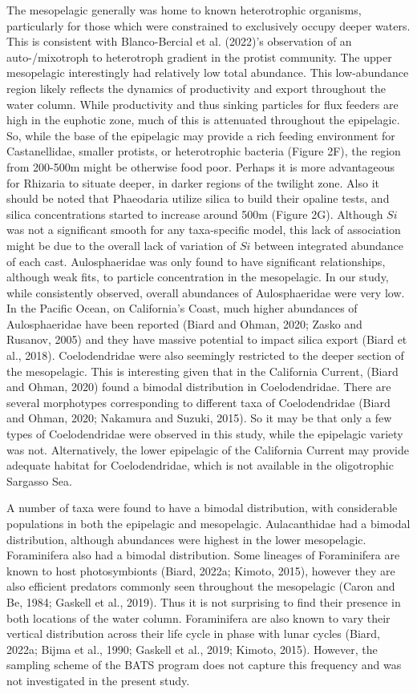 \documentclass[
]{article}
\begin{document}
The mesopelagic generally was home to known heterotrophic organisms,
particularly for those which were constrained to exclusively occupy
deeper waters. This is consistent with Blanco-Bercial et al. (2022)'s
observation of an auto-/mixotroph to heterotroph gradient in the protist
community. The upper mesopelagic interestingly had relatively low total
abundance. This low-abundance region likely reflects the dynamics of
productivity and export throughout the water column. While productivity
and thus sinking particles for flux feeders are high in the euphotic
zone, much of this is attenuated throughout the epipelagic. So, while
the base of the epipelagic may provide a rich feeding environment for
Castanellidae, smaller protists, or heterotrophic bacteria (Figure 2F),
the region from 200-500m might be otherwise food poor. Perhaps it is
more advantageous for Rhizaria to situate deeper, in darker regions of
the twilight zone. Also it should be noted that Phaeodaria utilize
silica to build their opaline tests, and silica concentrations started
to increase around 500m (Figure 2G). Although \(Si\) was not a
significant smooth for any taxa-specific model, this lack of association
might be due to the overall lack of variation of \(Si\) between
integrated abundance of each cast. Aulosphaeridae was only found to have
significant relationships, although weak fits, to particle concentration
in the mesopelagic. In our study, while consistently observed, overall
abundances of Aulosphaeridae were very low. In the Pacific Ocean, on
California's Coast, much higher abundances of Aulosphaeridae have been
reported (Biard and Ohman, 2020; Zasko and Rusanov, 2005) and they have
massive potential to impact silica export (Biard et al., 2018).
Coelodendridae were also seemingly restricted to the deeper section of
the mesopelagic. This is interesting given that in the California
Current, (Biard and Ohman, 2020) found a bimodal distribution in
Coelodendridae. There are several morphotypes corresponding to different
taxa of Coelodendridae (Biard and Ohman, 2020; Nakamura and Suzuki,
2015). So it may be that only a few types of Coelodendridae were
observed in this study, while the epipelagic variety was not.
Alternatively, the lower epipelagic of the California Current may
provide adequate habitat for Coelodendridae, which is not available in
the oligotrophic Sargasso Sea.

A number of taxa were found to have a bimodal distribution, with
considerable populations in both the epipelagic and mesopelagic.
Aulacanthidae had a bimodal distribution, although abundances were
highest in the lower mesopelagic. Foraminifera also had a bimodal
distribution. Some lineages of Foraminifera are known to host
photosymbionts (Biard, 2022a; Kimoto, 2015), however they are also
efficient predators commonly seen throughout the mesopelagic (Caron and
Be, 1984; Gaskell et al., 2019). Thus it is not surprising to find their
presence in both locations of the water column. Foraminifera are also
known to vary their vertical distribution across their life cycle in
phase with lunar cycles (Biard, 2022a; Bijma et al., 1990; Gaskell et
al., 2019; Kimoto, 2015). However, the sampling scheme of the BATS
program does not capture this frequency and was not investigated in the
present study.
\end{document}
